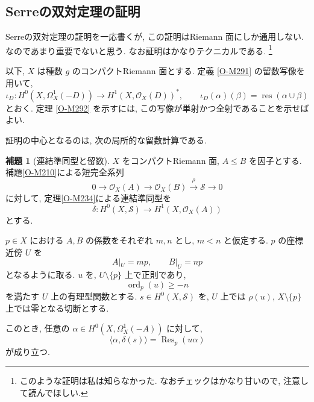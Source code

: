 \documentclass[dvipdfmx,a4paper,11pt]{article} %
\theoremstyle{definition}
\numberwithin{equation}{section}
\newtheorem{lem}[thm]{補題}
\begin{document}
\subsection{Serreの双対定理の証明}\label{O-S054}
Serreの双対定理の証明を一応書くが, この証明はRiemann 面にしか通用しない. なのであまり重要でないと思う. なお証明はかなりテクニカルである. \footnote{このような証明は私は知らなかった. なおチェックはかなり甘いので, 注意して読んでほしい. }

以下, $X$ は種数 $g$ のコンパクトRiemann 面とする.
定義 \ref{O-M291} の留数写像を用いて, 
\begin{equation}\label{eq-serre-iota}
\iota_D:
H^0(X,\Omega_X^1(-D))
\longrightarrow H^1(X,\mathcal O_X(D))^*,
\qquad
\iota_D(\alpha)(\beta)
=\operatorname{res}(\alpha\cup\beta)
\end{equation}
とおく.
定理 \ref{O-M292} を示すには, 
この写像が単射かつ全射であることを示せばよい.

証明の中心となるのは, 次の局所的な留数計算である.

\begin{lem}[連結準同型と留数]\label{O-M293}
$X$ をコンパクトRiemann 面, $A\leq B$ を因子とする.
補題\ref{O-M210}による短完全系列
\[
0\longrightarrow\mathcal O_X(A)
\longrightarrow\mathcal O_X(B)
\xrightarrow{\rho}\mathcal S
\longrightarrow0
\]
に対して, 定理\ref{O-M234}による連結準同型を
\[
\delta:H^0(X,\mathcal S)
\longrightarrow H^1(X,\mathcal O_X(A))
\]
とする.

$p\in X$ における $A,B$ の係数をそれぞれ $m,n$ とし,
$m<n$ と仮定する.
$p$ の座標近傍 $U$ を
\[
A|_U=mp,\qquad B|_U=np
\]
となるように取る.
$u$ を, $U\setminus\{p\}$ 上で正則であり,
\[
\operatorname{ord}_p(u)\geq-n
\]
を満たす $U$ 上の有理型関数とする.
$s\in H^0(X,\mathcal S)$ を,
$U$ 上では $\rho(u)$, $X\setminus\{p\}$ 上では零となる切断とする.

このとき, 任意の
$\alpha\in H^0(X,\Omega_X^1(-A))$ に対して,
\begin{equation}\label{eq-serre-local-residue}
\langle\alpha,\delta(s)\rangle
=\operatorname{Res}_p(u\alpha)
\end{equation}
が成り立つ.
\end{lem}
\end{document}

